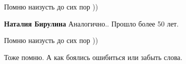  
 
 
 
 

Помню наизусть до сих пор ))

\textbf{Наталия Бирулина} Аналогично.. Прошло более 50 лет.

Помню наизусть до сих пор ))

Тоже помню. А как боялись ошибиться или забыть слова.
